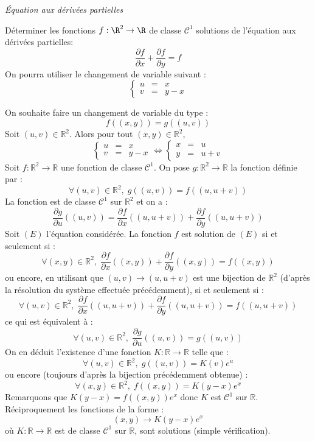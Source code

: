 \documentclass[a4paper,10pt]{report}
\begin{document}
\medskip

\begin{center}
\textit{{ {\large Équation aux dérivées partielles}}}
\end{center}

\medskip



\begin{Exercice}{} Déterminer les fonctions $f : \R^{2} \rightarrow \R$ de classe $\mathcal{C}^{1}$ solutions de l'équation aux dérivées partielles:
  \[
  \frac{\partial f}{\partial x} + \frac{\partial f}{\partial y} = f
  \]
On pourra utiliser le changement de variable suivant :
  \[
  \left\lbrace\begin{array}{lll}
    u & = &  x \\
    v & = & y - x
  \end{array}\right.
  \]
\end{Exercice} 

\corr On souhaite faire un changement de variable du type :
$$ f((x,y))=g((u,v))$$
Soit $(u,v) \in \mathbb{R}^2$. Alors pour tout $(x,y) \in \mathbb{R}^2$,
$$  \left\lbrace\begin{array}{lll}
    u & = &  x \\
    v & = & y - x
  \end{array}\right. \Longleftrightarrow  \left\lbrace\begin{array}{lll}
    x & = &  u \\
    y & = & u+v
  \end{array}\right.$$
 Soit $f : \mathbb{R}^2 \rightarrow \mathbb{R}$ une fonction de classe $\mathcal{C}^1$. On pose $g : \mathbb{R}^2 \rightarrow \mathbb{R}$ la fonction définie par :
 $$ \forall (u,v) \in \mathbb{R}^2, \; g((u,v)) = f((u,u+v))$$
 La fonction est de classe $\mathcal{C}^1$ sur $\mathbb{R}^2$ et on a :
 $$ \dfrac{\partial g}{\partial u} ((u,v)) = \dfrac{\partial f}{\partial x} ((u,u+v)) + \dfrac{\partial f}{\partial y} ((u,u+v))$$
 Soit $(E)$ l'équation considérée. La fonction $f$ est solution de $(E)$ si et seulement si :
 $$ \forall (x,y) \in \mathbb{R}^2, \;  \frac{\partial f}{\partial x}((x,y)) + \frac{\partial f}{\partial y}((x,y)) = f((x,y))$$
 ou encore, en utilisant que $(u,v) \rightarrow (u,u+v)$ est une bijection de $\mathbb{R}^2$ (d'après la résolution du système effectuée précédemment), si et seulement si :
 $$ \forall (u,v) \in \mathbb{R}^2, \;  \frac{\partial f}{\partial x}((u,u+v)) + \frac{\partial f}{\partial y}((u,u+v)) = f((u,u+v))$$
 ce qui est équivalent à :
 $$ \forall (u,v) \in \mathbb{R}^2, \; \dfrac{\partial g}{\partial u} ((u,v)) = g((u,v))$$
On en déduit l'existence d'une fonction $K : \mathbb{R} \rightarrow \mathbb{R}$ telle que :
$$  \forall (u,v) \in \mathbb{R}^2, \; g((u,v)) = K(v) e^{u}$$
ou encore (toujours d'après la bijection précédemment obtenue) :
$$  \forall (x,y) \in \mathbb{R}^2, \;  f((x,y)) = K(y-x) e^x$$
Remarquons que $K(y-x)= f((x,y))e^{x}$ donc $K$ est $\mathcal{C}^1$ sur $\mathbb{R}$. Réciproquement les fonctions de la forme :
$$ (x,y) \rightarrow  K(y-x) e^x$$
où $K : \mathbb{R} \rightarrow \mathbb{R}$ est de classe $\mathcal{C}^1$ sur $\mathbb{R}$, sont solutions (simple vérification).
\end{document}
